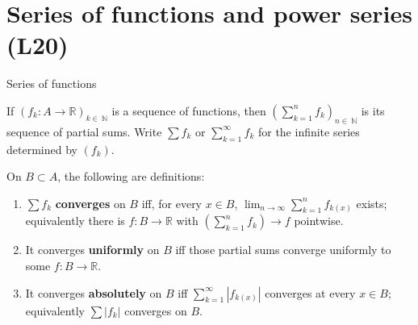 \section{Series of functions and power series (L20)}

\begin{definition}{Series of functions}

If \(\left( {f_{k}:A\rightarrow\mathbb{R}} \right)_{k \in \ \mathbb{N}}\) is a sequence of functions, then \(\left( {\sum_{k = 1}^{n}f_{k}} \right)_{n \in \ \mathbb{N}}\) is its sequence of partial sums. Write \(\sum f_{k}\) or \(\sum_{k = 1}^{\infty}f_{k}\) for the infinite series determined by \(\left( f_{k} \right)\).

On \(B \subset A\), the following are definitions:

\begin{enumerate}
\tightlist
\item
  \(\sum f_{k}\) \textbf{converges} on \(B\) iff, for every \(x \in B\), \(\lim_{n\rightarrow\infty}\sum_{k = 1}^{n}f_{k{(x)}}\) exists; equivalently there is \(f:B\rightarrow\mathbb{R}\) with \(\left( {\sum_{k = 1}^{n}f_{k}} \right)\rightarrow f\) pointwise.
\item
  It converges \textbf{uniformly} on \(B\) iff those partial sums converge uniformly to some \(f:B\rightarrow\mathbb{R}\).
\item
  It converges \textbf{absolutely} on \(B\) iff \(\sum_{k = 1}^{\infty}\left| f_{k{(x)}} \right|\) converges at every \(x \in B\); equivalently \(\sum\left| f_{k} \right|\) converges on \(B\).
\end{enumerate}

\end{definition}

